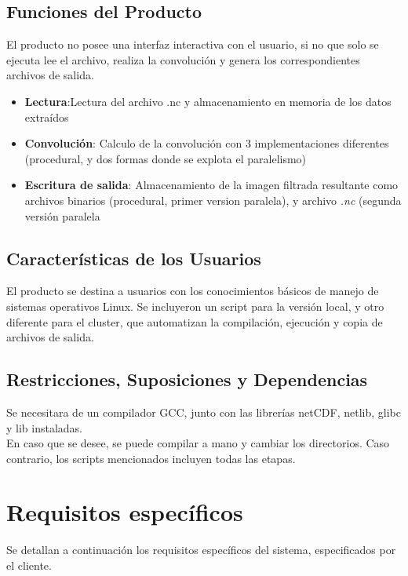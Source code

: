 \documentclass{article}
\begin{document}
\subsection{Funciones del Producto}
 El producto no posee una interfaz interactiva con el usuario, si no que solo se ejecuta lee el archivo, realiza la convolución y genera los correspondientes archivos de salida.\\
\begin{itemize}
\item \textbf{Lectura}:Lectura del archivo .nc y almacenamiento en memoria de los datos extraídos
\item \textbf{Convolución}: Calculo de la convolución con 3 implementaciones diferentes (procedural, y dos formas donde se explota el paralelismo)
\item \textbf{Escritura de salida}: Almacenamiento de la imagen filtrada resultante como archivos binarios (procedural, primer version paralela), y archivo \textit{.nc} (segunda versión paralela
\end{itemize}
\subsection{Características de los Usuarios}
El producto se destina a usuarios con los conocimientos básicos de manejo de sistemas operativos Linux. Se incluyeron un script para la versión local, y otro diferente para el cluster, que automatizan la compilación, ejecución y copia de archivos de salida.\\
\subsection{Restricciones, Suposiciones y Dependencias}
Se necesitara de un compilador GCC, junto con las librerías netCDF, netlib, glibc y lib instaladas.\\
En caso que se desee, se puede compilar a mano y cambiar los directorios. Caso contrario, los scripts mencionados incluyen todas las etapas. 
\section{Requisitos específicos}
Se detallan a continuación los requisitos específicos del sistema, especificados por el cliente.
\end{document}
